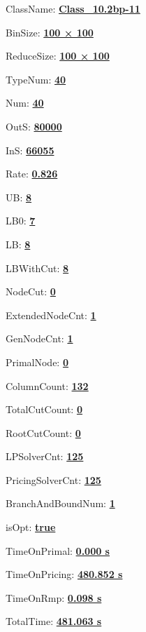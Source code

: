 \documentclass[11pt]{article}
\begin{document}
\pagestyle{empty}


ClassName: \underline{\textbf{Class_10.2bp-11}}
\par
BinSize: \underline{\textbf{100 × 100}}
\par
ReduceSize: \underline{\textbf{100 × 100}}
\par
TypeNum: \underline{\textbf{40}}
\par
Num: \underline{\textbf{40}}
\par
OutS: \underline{\textbf{80000}}
\par
InS: \underline{\textbf{66055}}
\par
Rate: \underline{\textbf{0.826}}
\par
UB: \underline{\textbf{8}}
\par
LB0: \underline{\textbf{7}}
\par
LB: \underline{\textbf{8}}
\par
LBWithCut: \underline{\textbf{8}}
\par
NodeCut: \underline{\textbf{0}}
\par
ExtendedNodeCnt: \underline{\textbf{1}}
\par
GenNodeCnt: \underline{\textbf{1}}
\par
PrimalNode: \underline{\textbf{0}}
\par
ColumnCount: \underline{\textbf{132}}
\par
TotalCutCount: \underline{\textbf{0}}
\par
RootCutCount: \underline{\textbf{0}}
\par
LPSolverCnt: \underline{\textbf{125}}
\par
PricingSolverCnt: \underline{\textbf{125}}
\par
BranchAndBoundNum: \underline{\textbf{1}}
\par
isOpt: \underline{\textbf{true}}
\par
TimeOnPrimal: \underline{\textbf{0.000 s}}
\par
TimeOnPricing: \underline{\textbf{480.852 s}}
\par
TimeOnRmp: \underline{\textbf{0.098 s}}
\par
TotalTime: \underline{\textbf{481.063 s}}
\par
\newpage


\end{document}
